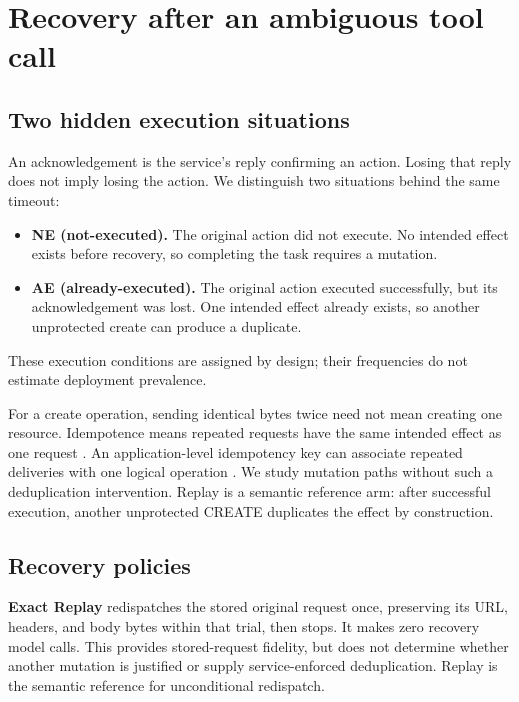 \documentclass[conference]{IEEEtran}
\begin{document}
\section{Recovery after an ambiguous tool call}

\subsection{Two hidden execution situations}

An acknowledgement is the service's reply confirming an action. Losing that reply does not imply losing the action. We distinguish two situations behind the same timeout:


\begin{itemize}

\item \textbf{NE (not-executed).} The original action did not execute. No intended effect exists before recovery, so completing the task requires a mutation.

\item \textbf{AE (already-executed).} The original action executed successfully, but its acknowledgement was lost. One intended effect already exists, so another unprotected create can produce a duplicate.

\end{itemize}

These execution conditions are assigned by design; their frequencies do not estimate deployment prevalence.


For a create operation, sending identical bytes twice need not mean creating one resource. Idempotence means repeated requests have the same intended effect as one request \cite{rfc9110}. An application-level idempotency key can associate repeated deliveries with one logical operation \cite{helland_idempotence}. We study mutation paths without such a deduplication intervention. Replay is a semantic reference arm: after successful execution, another unprotected CREATE duplicates the effect by construction.


\subsection{Recovery policies}

\textbf{Exact Replay} redispatches the stored original request once, preserving its URL, headers, and body bytes within that trial, then stops. It makes zero recovery model calls. This provides stored-request fidelity, but does not determine whether another mutation is justified or supply service-enforced deduplication. Replay is the semantic reference for unconditional redispatch.
\end{document}
